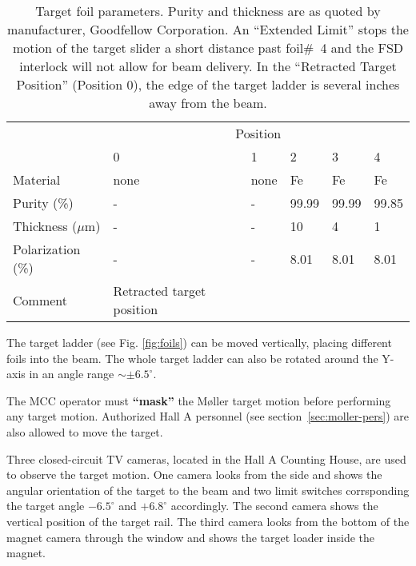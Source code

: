 { 
\begin{table}[htb]
\begin{center}
\begin{tabular}{| p{3cm} | p{3cm} | p{1.5cm} | p{1.5cm} | p{1.5cm} | p{1.5cm} |} \hline
          & \multicolumn{5}{|c|}{Position} \\ \cline{2-6}
          & \hfill 0  &  \hfill 1  &   \hfill  2  &   \hfill  3   &   \hfill  4   \\
\hline 
  Material            &  \hfill  none &  \hfill none &  \hfill Fe &  \hfill Fe &  \hfill Fe \\
  Purity (\%) & - & \hfill - & \hfill 99.99 & \hfill 99.99 & \hfill 99.85 \\
  Thickness ($\mu$m)   &  \hfill  -    &  \hfill -  &   \hfill 10   &  \hfill 4  &  \hfill 1   \\
  Polarization (\%)      &        \hfill  -   &  \hfill - &  \hfill 8.01 &  \hfill 8.01 &  \hfill 8.01 \\
  Comment             &  Retracted target position &        &        &      &    \\
\hline
\end{tabular}
\end{center}
\caption[Moller target foils]{Target foil parameters. Purity and thickness are as quoted by manufacturer, Goodfellow Corporation. An ``Extended Limit'' stops the motion
of the target slider a short distance past foil\#~4 and the FSD interlock will not allow
for beam delivery. In the ``Retracted Target Position'' (Position 0), the edge of the target ladder is several
inches away from the beam.}
\label{Tab1}
\end{table}

The target ladder (see Fig. \ref{fig:foils}) can be moved vertically, placing different foils
into the beam. The whole target ladder can also be rotated around the Y-axis 
in an angle range $\sim\pm 6.5^\circ$.

The MCC operator must {\bf ``mask''} the M{\o}ller target motion before performing any target motion.
Authorized Hall A personnel (see section~\ref{sec:moller-pers}) are also allowed to move the target. 

Three closed-circuit TV cameras, located in the Hall A Counting House, are used to observe the target motion. One camera looks from the side and shows the angular orientation of the target to the beam and two limit switches corrsponding the target angle $-6.5^\circ$ and $+6.8^\circ$ accordingly. The second camera shows 
the vertical position of the target rail. The third camera looks from the bottom of the magnet camera through the window and shows the target loader inside the magnet.

}
